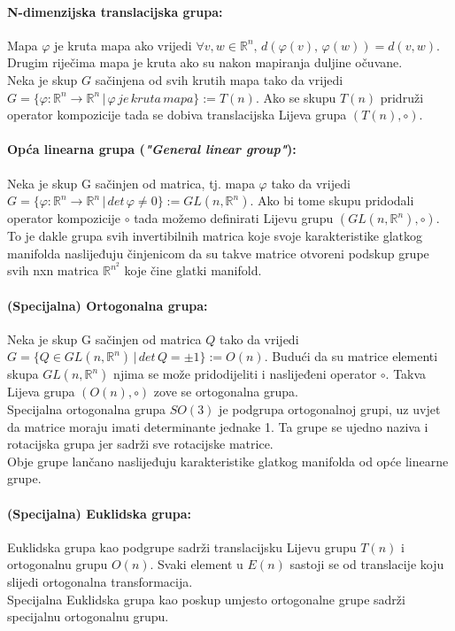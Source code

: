 \documentclass[times, utf8, diplomski]{fer}
\begin{document}
	\paragraph{N-dimenzijska translacijska grupa:} Mapa $\varphi$ je kruta mapa ako vrijedi 
	$\forall v, w \in \mathbb{R}^n, \, d(\varphi(v), \, \varphi(w)) = d(v, w)$. Drugim riječima mapa je kruta ako su nakon mapiranja duljine očuvane. \\
	Neka je skup $G$ sačinjena od svih krutih mapa tako da vrijedi $G = \{ \varphi: \mathbb{R}^n \rightarrow \mathbb{R}^n \, | \, \varphi\, je\, kruta\, mapa\} := T(n)$. Ako se skupu $T(n)$ pridruži operator kompozicije tada se dobiva translacijska Lijeva grupa $(T(n), \circ)$.
	
	\paragraph{Opća linearna grupa (\textit{"General linear group"}):} Neka je skup G sačinjen od matrica, tj. mapa $\varphi$ tako da vrijedi $G = \{ \varphi: \mathbb{R}^n \rightarrow \mathbb{R}^n \,|\, det \, \varphi \neq 0 \}:=GL(n, \mathbb{R}^n)$. Ako bi tome skupu pridodali operator kompozicije $\circ$ tada možemo definirati Lijevu grupu $(GL(n, \mathbb{R}^n), \circ)$. To je dakle grupa svih invertibilnih matrica koje svoje karakteristike glatkog manifolda naslijeđuju činjenicom da su takve matrice otvoreni podskup grupe svih nxn matrica $\mathbb{R}^{n^2}$ koje čine glatki manifold.
	
	\paragraph{(Specijalna) Ortogonalna grupa:} Neka je skup G sačinjen od matrica $Q$ tako da vrijedi \\ 
	$G = \{ Q \in GL(n, \mathbb{R}^n) \,|\, det \, Q = \pm 1\} := O(n)$. Budući da su matrice elementi skupa $GL(n, \mathbb{R}^n)$ njima se može pridodijeliti i naslijeđeni operator $\circ$. Takva Lijeva grupa $(O(n),\circ)$ zove se ortogonalna grupa. \\
	Specijalna ortogonalna grupa $SO(3)$ je podgrupa ortogonalnoj grupi, uz uvjet da matrice moraju imati determinante jednake 1. Ta grupe se ujedno naziva i rotacijska grupa jer sadrži sve rotacijske matrice. \\
	Obje grupe lančano naslijeđuju karakteristike glatkog manifolda od opće linearne grupe.
	
	\paragraph{(Specijalna) Euklidska grupa:} Euklidska grupa kao podgrupe sadrži translacijsku Lijevu grupu $T(n)$ i ortogonalnu grupu $O(n)$. Svaki element u $E(n)$ sastoji se od translacije koju slijedi ortogonalna transformacija. \\
	Specijalna Euklidska grupa kao poskup umjesto ortogonalne grupe sadrži specijalnu ortogonalnu grupu.
	
\end{document}
